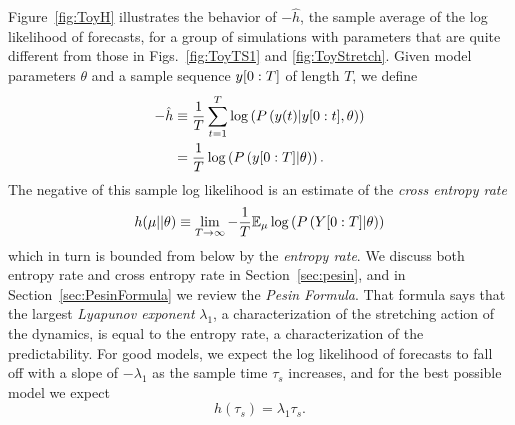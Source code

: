 Figure~\ref{fig:ToyH} illustrates the behavior of $-\hat h$, the sample
average of the log likelihood of forecasts, for a group of simulations
with parameters that are quite different from those in
Figs.~\ref{fig:ToyTS1} and \ref{fig:ToyStretch}.  Given model parameters
$\theta$ and a sample sequence $y[0:T]$ of length $T$, we define
\begin{align*}
  -\hat h &\equiv \frac{1}{T} \sum_{t=1}^T
    \log \left( P \left({y}{(t)}|y[0:t], \theta
      \right)\right)\\
    &=  \frac{1}{T} \log \left( P \left(y[0:T]| \theta
      \right)\right).
\end{align*}
The negative of this sample log likelihood is an estimate of the
\emph{cross entropy rate} 
\begin{equation*}
  h(\mu||\theta) \equiv  \lim_{T \rightarrow \infty} - \frac{1}{T}
  \mathbb{E}_{\mu} \log \left( P \left(Y[0:T]|\theta \right) \right)
\end{equation*}
which in turn is bounded from below by the \emph{entropy rate}.  We
discuss both entropy rate and cross entropy rate in
Section~\ref{sec:pesin}, and in Section~\ref{sec:PesinFormula} we
review the \emph{Pesin Formula}.  That formula says that the largest
\emph{Lyapunov exponent} $\lambda_1$, a characterization of the
stretching action of the dynamics, is equal to the entropy rate, a
characterization of the predictability.  For good models, we expect
the log likelihood of forecasts to fall off with a slope of
$-\lambda_1$ as the sample time $\tau_s$ increases, and for the best
possible model we expect
\begin{equation}
  \label{eq:bound1}
  h(\tau_s) = \lambda_1 \tau_s.
\end{equation}

